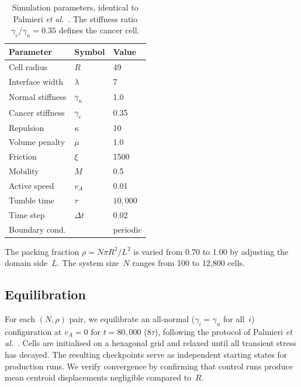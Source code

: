 \documentclass[aps,pre,twocolumn,superscriptaddress,longbibliography,floatfix]{revtex4-2}
\newcommand{\vA}{v_{\!A}}                  %
\begin{document}
\begin{table}[b]
  \caption{Simulation parameters, identical to Palmieri
    \textit{et al.}~\cite{Palmieri2015}.  The stiffness
    ratio $\gamma_c / \gamma_n = 0.35$ defines the cancer cell.}
  \label{tab:params}
  \begin{ruledtabular}
  \begin{tabular}{lll}
    Parameter & Symbol & Value \\ \hline
    Cell radius        & $R$        & 49                \\
    Interface width    & $\lambda$  & 7                 \\
    Normal stiffness   & $\gamma_n$ & 1.0               \\
    Cancer stiffness   & $\gamma_c$ & 0.35              \\
    Repulsion          & $\kappa$   & 10                \\
    Volume penalty     & $\mu$      & 1.0               \\
    Friction           & $\xi$      & 1500              \\
    Mobility           & $M$        & 0.5               \\
    Active speed       & $\vA$      & 0.01              \\
    Tumble time        & $\tau$     & $10{,}000$        \\
    Time step          & $\Delta t$ & 0.02              \\
    Boundary cond.     &            & periodic          \\
  \end{tabular}
  \end{ruledtabular}
\end{table}

The packing fraction $\rho = N\pi R^2 / L^2$ is varied from 0.70 to
1.00 by adjusting the domain side~$L$.  The system size~$N$ ranges
from 100 to 12{,}800 cells.

\subsection{Equilibration}
\label{sec:methods:eq}

For each $(N, \rho)$ pair, we equilibrate an all-normal ($\gamma_i
= \gamma_n$ for all~$i$) configuration at $\vA = 0$ for
$t = 80{,}000$ ($8\tau$), following the protocol of Palmieri
\textit{et al.}~\cite{Palmieri2015}.  Cells are initialised on a
hexagonal grid and relaxed until all transient stress has decayed.
The resulting checkpoints serve as independent starting states for
production runs.  We verify convergence by confirming that control
runs produce mean centroid displacements negligible compared to~$R$.
\end{document}
